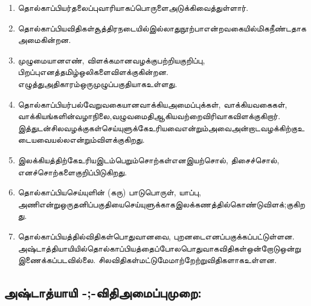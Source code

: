 \begin{enumerate}
\item தொல்காப்பியர்தலைப்புவாரியாகப்பொருளைஅடுக்கிவைத்துள்ளார். 

 \item தொல்காப்பியவிதிகள்சூத்திரநடையில்இல்லாதுநூற்பாஎன்றவகையில்மிகநீண்டதாகஅமைகின்றன.

 \item முழுமையானஎண், விளக்கமானவழக்குபற்றியகுறிப்பு, பிறப்புஎனத்தமிழ்ஒலிகளைவிளக்குகின்றன. எழுத்துஅதிகாரம்ஒருமுழுப்பகுதியாகஉள்ளது.

 \item தொல்காப்பியர்பல்வேறுவகையானவாக்கியஅமைப்புக்கள், வாக்கியவகைகள், வாக்கியங்களின்வழாநிலை,வழுவமைதிஆகியவற்றைவிரிவாகவிளக்குகிறார். இத்துடன்சிலவழக்குகள்செய்யுளுக்கேஉரியவைஎன்றும்அவைஅன்றாடவழக்கிற்குஉடையவையல்லஎன்றும்விளக்குகிறது.

 \item இலக்கியத்திற்கேஉரியஇடம்பெறும்சொற்கள்எனஇயற்சொல், திசைச்சொல், எனச்சொற்களைகுறிப்பிடுகிறது.

 \item தொல்காப்பியசெய்யுளின் (கரு) பாடுபொருள், யாப்பு, அணிஎன்றுஒருதனிப்பகுதியைசெய்யுளுக்காகஇலக்கணத்தில்கொண்டுவிளக்;குகிறது.

 \item தொல்காப்பியத்தில்விதிகள்பொதுவானவை, புறனடைஎனப்பகுக்கப்பட்டுள்ளன. அஷ்டாத்தியாயியில்தொல்காப்பியத்தைப்போலபொதுவாகவிதிகள்ஒன்றோடுஒன்றுஇணைக்கப்படவில்லை. சிலவிதிகள்மட்டுமேமாற்றேற்றுவிதிகளாகஉள்ளன. 

\end{enumerate}


\subsection{அஷ்டாத்யாயி -;-விதிஅமைப்புமுறை:}

